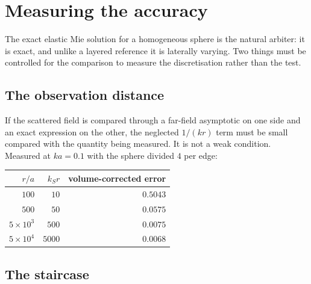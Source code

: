 \documentclass[11pt,a4paper]{article}
\begin{document}
\section{Measuring the accuracy}\label{sec:measure}

The exact elastic Mie solution for a homogeneous sphere is the natural arbiter:
it is exact, and unlike a layered reference it is laterally varying.  Two
things must be controlled for the comparison to measure the discretisation
rather than the test.

\subsection{The observation distance}

If the scattered field is compared through a far-field asymptotic on one side
and an exact expression on the other, the neglected $1/(kr)$ term must be
small compared with the quantity being measured.  It is not a weak condition.
Measured at $ka = 0.1$ with the sphere divided $4$ per edge:

\begin{center}
\begin{tabular}{@{}rrr@{}}
\toprule
$r/a$ & $k_S r$ & volume-corrected error\\
\midrule
$100$ & $10$ & $0.5043$\\
$500$ & $50$ & $0.0575$\\
$5\times10^{3}$ & $500$ & $0.0075$\\
$5\times10^{4}$ & $5000$ & $0.0068$\\
\bottomrule
\end{tabular}
\end{center}

\subsection{The staircase}
\end{document}
